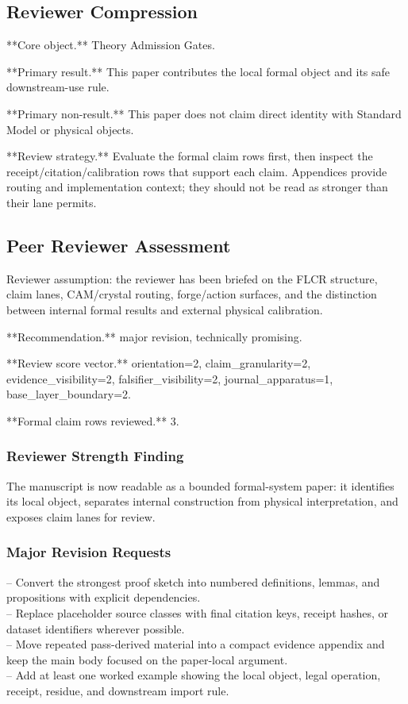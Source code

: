\documentclass[11pt]{article}
\begin{document}
\subsection*{Reviewer Compression}

**Core object.** Theory Admission Gates.

**Primary result.** This paper contributes the local formal object and its safe downstream-use rule.

**Primary non-result.** This paper does not claim direct identity with Standard Model or physical objects.

**Review strategy.** Evaluate the formal claim rows first, then inspect the receipt/citation/calibration rows that support each claim. Appendices provide routing and implementation context; they should not be read as stronger than their lane permits.

\subsection*{Peer Reviewer Assessment}

Reviewer assumption: the reviewer has been briefed on the FLCR structure, claim lanes, CAM/crystal routing, forge/action surfaces, and the distinction between internal formal results and external physical calibration.

**Recommendation.** major revision, technically promising.

**Review score vector.** orientation=2, claim\_granularity=2, evidence\_visibility=2, falsifier\_visibility=2, journal\_apparatus=1, base\_layer\_boundary=2.

**Formal claim rows reviewed.** 3.

\subsubsection*{Reviewer Strength Finding}

The manuscript is now readable as a bounded formal-system paper: it identifies its local object, separates internal construction from physical interpretation, and exposes claim lanes for review.

\subsubsection*{Major Revision Requests}

\noindent{}-- Convert the strongest proof sketch into numbered definitions, lemmas, and propositions with explicit dependencies.\\
\noindent{}-- Replace placeholder source classes with final citation keys, receipt hashes, or dataset identifiers wherever possible.\\
\noindent{}-- Move repeated pass-derived material into a compact evidence appendix and keep the main body focused on the paper-local argument.\\
\noindent{}-- Add at least one worked example showing the local object, legal operation, receipt, residue, and downstream import rule.\\
\end{document}
